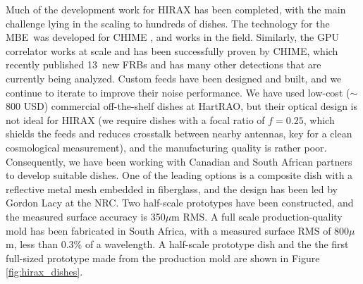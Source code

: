 \documentclass[11pt]{article}
\newcommand{\mbe}{{\rm MBE}}
\begin{document}
Much of the development work for HIRAX has been completed, with the
main challenge lying in the scaling to hundreds of dishes.  The
technology for the \mbe\ was developed for CHIME \citep{Bandura16},
and works in the field.  Similarly, the GPU correlator
\citep{Recnik15} works at scale and has been successfully proven by
CHIME, which recently published 13~new FRBs \citep{chime_frbs} and has
many other detections that are currently being analyzed.  Custom feeds
have been designed and built, and we continue to iterate to improve
their noise performance.
We have used low-cost ($\sim$800 USD) commercial off-the-shelf dishes
at HartRAO, but their optical design is not ideal for HIRAX (we
require dishes with a focal ratio of $f=0.25$, which shields the feeds
and reduces crosstalk between nearby antennas, key for a clean
cosmological measurement), and the manufacturing quality is rather
poor.  Consequently, we have been working with Canadian and South
African partners to develop suitable dishes.  One of the leading
options is a composite dish with a reflective metal mesh embedded in
fiberglass, and the design has been led by Gordon Lacy at the NRC.
Two half-scale prototypes have been constructed, and the measured
surface accuracy is 350$\mu$m RMS.  A full scale production-quality
mold has been fabricated in South Africa, with a measured surface RMS
of 800$\mu$m, less than 0.3\% of a wavelength.  A half-scale prototype
dish and the the first full-sized prototype made from the production
mold are shown in Figure \ref{fig:hirax_dishes}.
\end{document}
